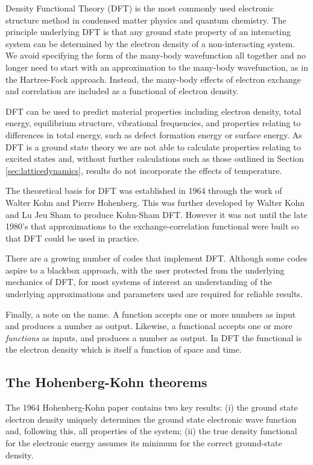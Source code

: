 Density Functional Theory (DFT) is the most commonly used electronic structure method in condensed matter physics and quantum chemistry. The principle underlying DFT is that any ground state property of an interacting system can be determined by the electron density of a non-interacting system. We avoid specifying the form of the many-body wavefunction all together and no longer need to start with an approximation to the many-body wavefunction, as in the Hartree-Fock approach. Instead, the many-body effects of electron exchange and correlation are included as a functional of electron density.

DFT can be used to predict material properties including electron density, total energy, equilibrium structure, vibrational frequencies, and properties relating to differences in total energy, such as defect formation energy or surface energy. 
As DFT is a ground state theory we are not able to calculate properties relating to excited states and, without further calculations such as those outlined in Section \ref{sec:latticedynamics}, results do not incorporate the effects of temperature. 

The theoretical basis for DFT was established in 1964 through the work of Walter Kohn and Pierre Hohenberg.\autocite{Hohenberg1964} This was further developed by Walter Kohn and Lu Jeu Sham to produce Kohn-Sham DFT.\autocite{Kohn1965} However it was not until the late 1980's that approximations to the exchange-correlation functional were built so that DFT could be used in practice. 

There are a growing number of codes that implement DFT. 
Although some codes aspire to a blackbox approach, with the user protected from the underlying mechanics of DFT, for most systems of interest an understanding of the underlying approximations and parameters used are required for reliable results.

Finally, a note on the name. A function accepts one or more numbers as input and produces a number as output. Likewise, a functional accepts one or more \textit{functions} as inputs, and produces a number as output. In DFT the functional is the electron density which is itself a function of space and time.

\subsection{The Hohenberg-Kohn theorems}

The 1964 Hohenberg-Kohn paper\autocite{Hohenberg1964} contains two key results: (i) the ground state electron density uniquely determines the ground state electronic wave function and, following this, all properties of the system; (ii) the true density functional for the electronic energy assumes its minimum for the correct ground-state density.\autocite{Scuseria05}

